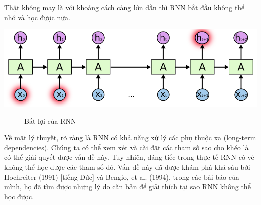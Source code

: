 Thật không may là với khoảng cách càng lớn dần thì RNN bắt đầu không thể nhớ và học được nữa.
\begin{center}
    \includegraphics[scale=.3]{image/chapter6/ptx2.png}
    \begin{figure}[htp]
    \begin{center}
     
    \end{center}
    \caption{Bất lợi của RNN}
    \end{figure}
\end{center}
Về mặt lý thuyết, rõ ràng là RNN có khả năng xử lý các phụ thuộc xa (long-term dependencies). Chúng ta có thể xem xét và cài đặt các tham số sao cho khéo là có thể giải quyết được vấn đề này. Tuy nhiên, đáng tiếc trong thực tế RNN có vẻ không thể học được các tham số đó. Vấn đề này đã được khám phá khá sâu bởi Hochreiter (1991) [tiếng Đức] và Bengio, et al. (1994), trong các bài báo của mình, họ đã tìm được nhưng lý do căn bản để giải thích tại sao RNN không thể học được.


